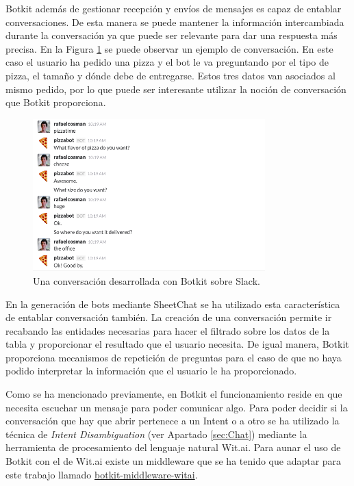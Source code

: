 Botkit además de gestionar recepción y envíos de mensajes es capaz de entablar conversaciones. De esta manera se puede mantener la información intercambiada durante la conversación ya que puede ser relevante para dar una respuesta más precisa. En la Figura \ref{fig:BotkitConversation} se puede observar un ejemplo de conversación. En este caso el usuario ha pedido una pizza y el bot le va preguntando por el tipo de pizza, el tamaño y dónde debe de entregarse. Estos tres datos van asociados al mismo pedido, por lo que puede ser interesante utilizar la noción de conversación que Botkit proporciona.

\begin{figure}[htb]
	\centering
	\includegraphics[width=0.8\textwidth]{./figs/BotkitConversation.png}
	\caption{Una conversación desarrollada con Botkit sobre Slack.}
	\label{fig:BotkitConversation}
\end{figure}

En la generación de bots mediante SheetChat se ha utilizado esta característica de entablar conversación también. La creación de una conversación permite ir recabando las entidades necesarias para hacer el filtrado sobre los datos de la tabla y proporcionar el resultado que el usuario necesita. De igual manera, Botkit proporciona mecanismos de repetición de preguntas para el caso de que no haya podido interpretar la información que el usuario le ha proporcionado.

Como se ha mencionado previamente, en Botkit el funcionamiento reside en que necesita escuchar un mensaje para poder comunicar algo. Para poder decidir si la conversación que hay que abrir pertenece a un Intent o a otro se ha utilizado la técnica de \emph{Intent Disambiguation} (ver Apartado \ref{sec:Chat}) mediante la herramienta de procesamiento del lenguaje natural Wit.ai. Para aunar el uso de Botkit con el de Wit.ai existe un middleware que se ha tenido que adaptar para este trabajo llamado \href{https://github.com/haritzmedina/botkit-middleware-witai}{botkit-middleware-witai}.

